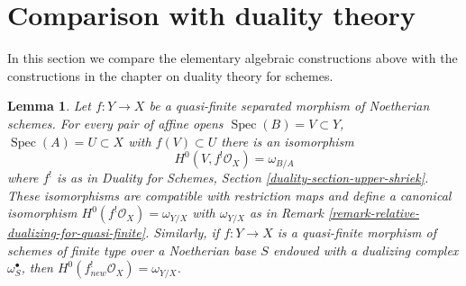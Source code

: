 \documentclass{stacks-project}
\theoremstyle{plain}
\newtheorem{lemma}[subsection]{Lemma}
\theoremstyle{definition}
\theoremstyle{remark}
\numberwithin{equation}{subsection}
\def\Spec{\mathop{\mathrm{Spec}}}
\begin{document}
\section{Comparison with duality theory}
\label{section-comparison}

\noindent
In this section we compare the elementary algebraic constructions
above with the constructions in the chapter on duality theory
for schemes.

\begin{lemma}
\label{lemma-compare-dualizing}
Let $f : Y \to X$ be a quasi-finite separated morphism of Noetherian schemes.
For every pair of affine opens $\Spec(B) = V \subset Y$,
$\Spec(A) = U \subset X$ with $f(V) \subset U$ there is an isomorphism
$$
H^0(V, f^!\mathcal{O}_X) = \omega_{B/A}
$$
where $f^!$ is as in
Duality for Schemes, Section \ref{duality-section-upper-shriek}.
These isomorphisms are compatible with restriction maps and define a canonical
isomorphism $H^0(f^!\mathcal{O}_X) = \omega_{Y/X}$ with
$\omega_{Y/X}$ as in Remark \ref{remark-relative-dualizing-for-quasi-finite}.
Similarly, if $f : Y \to X$ is a quasi-finite morphism of schemes of
finite type over a Noetherian base $S$ endowed with a dualizing complex
$\omega_S^\bullet$, then $H^0(f_{new}^!\mathcal{O}_X) = \omega_{Y/X}$.
\end{lemma}
\end{document}
